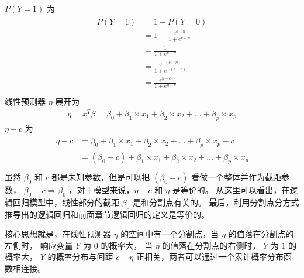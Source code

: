 \documentclass[letterpaper,10pt,english]{sphinxmanual}
\begin{document}
\(P(Y=1)\) 为
\begin{align}\label{equation:有序离散模型/content:eq_ordered_logistic_006}\!\begin{aligned}
P(Y=1) &= 1- P(Y=0)\\
&= 1 - \frac{e^{c-\eta}}{1+e^{c-\eta}}\\
&= \frac{1}{1+e^{c-\eta}}\\
&= \frac{e^{ -(c-\eta)}}{1+e^{-(c-\eta)}}\\
&= \frac{e^{ \eta-c}}{1+e^{\eta-c}}\\
\end{aligned}\end{align}
线性预测器 \(\eta\) 展开为
\begin{equation}\label{equation:有序离散模型/content:eq_ordered_logistic_007}
\begin{split}\eta = x^T\beta=\beta_0 + \beta_1 \times x_1 + \beta_2 \times x_2 +\dots+\beta_p \times x_p\end{split}
\end{equation}
\(\eta-c\) 为
\begin{align}\label{equation:有序离散模型/content:eq_ordered_logistic_008}\!\begin{aligned}
\eta-c &=  \beta_0 + \beta_1 \times x_1 + \beta_2 \times x_2 +\dots+\beta_p \times x_p -c\\
&=  (\beta_0-c) + \beta_1 \times x_1 + \beta_2 \times x_2 +\dots+\beta_p \times x_p\\
\end{aligned}\end{align}
虽然 \(\beta_0\) 和 \(c\) 都是未知参数，但是可以把 \((\beta_0-c)\) 看做一个整体并作为截距参数，
\(\beta_0-c \Rightarrow \beta_0\)
，对于模型来说，\(\eta-c\) 和 \(\eta\) 是等价的。
从这里可以看出，在逻辑回归模型中，线性部分的截距 \(\beta_0\) 是和分割点有关的。
最后，利用分割点分方式推导出的逻辑回归和前面章节逻辑回归的定义是等价的。

核心思想就是，在线性预测器 \(\eta\) 的空间中有一个分割点，当 \(\eta\) 的值落在分割点的左侧时，
响应变量 \(Y\) 为 \(0\) 的概率大，
当 \(\eta\) 的值落在分割点的右侧时，
\(Y\) 为 \(1\) 的概率大，
\(Y\) 的概率分布与间距 \(c-\eta\) 正相关，两者可以通过一个累计概率分布函数相连接。
\end{document}
